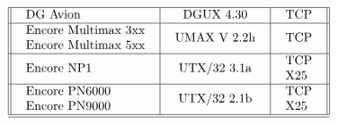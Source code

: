 \[\begin{tabular}[h]{||l|c|c||}
\hline
\begin{tabular}{l} DG Avion \end{tabular} & \begin{tabular}{l}   DGUX 4.30 \end{tabular} & \begin{tabular}{l} TCP \end{tabular} \\
\hline
\begin{tabular}{l} Encore Multimax 3xx\\Encore Multimax 5xx \end{tabular} & \begin{tabular}{l}  UMAX V 2.2h \end{tabular} & \begin{tabular}{l} TCP \end{tabular} \\
\hline
\begin{tabular}{l} Encore NP1 \end{tabular} & \begin{tabular}{l}  UTX/32 3.1a \end{tabular} & \begin{tabular}{l} TCP\\X25 \end{tabular} \\
\hline
\begin{tabular}{l} Encore PN6000\\Encore PN9000 \end{tabular} & \begin{tabular}{l}  UTX/32 2.1b \end{tabular} & \begin{tabular}{l} TCP\\X25 \end{tabular} \\
\hline
\hline
\end{tabular}\\
\]
